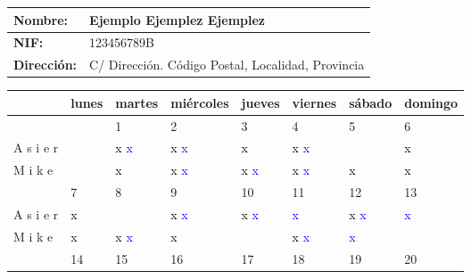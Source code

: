 \documentclass{article}%
\begin{document}
%
\normalsize%
\vspace*{8ex}%
\renewcommand{\arraystretch}{1.5}%
\begin{tabular}{l|l}%
\textbf{Nombre:}&Ejemplo Ejemplez Ejemplez\\%
\hline%
\textbf{NIF:}&123456789B\\%
\hline%
\textbf{Dirección:}&C/ Dirección. Código Postal, Localidad, Provincia\\%
\hline%
\end{tabular}%
\vspace*{8ex}%
\renewcommand{\arraystretch}{1.5}%
\begin{longtabu}{| X[l] | X[c] | X[c] | X[c] | X[c] | X[c] | X[c] | X[c] |}%
\hline%
%
\textbf{}&\textbf{lunes}&\textbf{martes}&\textbf{miércoles}&\textbf{jueves}&\textbf{viernes}&\textbf{sábado}&\textbf{domingo}\\%
\hline%
&&1&2&3&4&5&6\\%
\hline%
A%
s%
i%
e%
r&&\textcolor{black}{%
x%
}%
\textcolor{blue}{%
x%
}&\textcolor{black}{%
x%
}%
\textcolor{blue}{%
x%
}&\textcolor{black}{%
x%
}%
\textcolor{blue}{%
}&\textcolor{black}{%
x%
}%
\textcolor{blue}{%
x%
}&\textcolor{black}{%
}%
\textcolor{blue}{%
}&\textcolor{black}{%
x%
}%
\textcolor{blue}{%
}\\%
M%
i%
k%
e&&\textcolor{black}{%
x%
}%
\textcolor{blue}{%
}&\textcolor{black}{%
x%
}%
\textcolor{blue}{%
x%
}&\textcolor{black}{%
x%
}%
\textcolor{blue}{%
x%
}&\textcolor{black}{%
x%
}%
\textcolor{blue}{%
x%
}&\textcolor{black}{%
x%
}%
\textcolor{blue}{%
}&\textcolor{black}{%
x%
}%
\textcolor{blue}{%
}\\%
\hline%
\hline%
&7&8&9&10&11&12&13\\%
\hline%
A%
s%
i%
e%
r&\textcolor{black}{%
x%
}%
\textcolor{blue}{%
}&\textcolor{black}{%
}%
\textcolor{blue}{%
}&\textcolor{black}{%
x%
}%
\textcolor{blue}{%
x%
}&\textcolor{black}{%
x%
}%
\textcolor{blue}{%
x%
}&\textcolor{black}{%
}%
\textcolor{blue}{%
x%
}&\textcolor{black}{%
x%
}%
\textcolor{blue}{%
x%
}&\textcolor{black}{%
}%
\textcolor{blue}{%
x%
}\\%
M%
i%
k%
e&\textcolor{black}{%
x%
}%
\textcolor{blue}{%
}&\textcolor{black}{%
x%
}%
\textcolor{blue}{%
x%
}&\textcolor{black}{%
x%
}%
\textcolor{blue}{%
}&\textcolor{black}{%
}%
\textcolor{blue}{%
}&\textcolor{black}{%
x%
}%
\textcolor{blue}{%
x%
}&\textcolor{black}{%
}%
\textcolor{blue}{%
x%
}&\textcolor{black}{%
}%
\textcolor{blue}{%
}\\%
\hline%
\hline%
&14&15&16&17&18&19&20\\%

\end{longtabu}
\end{document}
